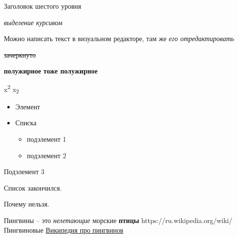 \documentclass[
  letterpaper,
  DIV=11,
  numbers=noendperiod]{scrartcl}
\begin{document}
Заголовок шестого уровня

\emph{выделение курсивом}

Можно написать текст в визуальном редакторе, там же \emph{его
отредактировать}

\sout{зачеркнуто}

\textbf{полужирное} \textbf{тоже полужирное}

x\textsuperscript{2} x\textsubscript{2}

\begin{itemize}
\item
  Элемент
\item
  Списка

  \begin{itemize}
  \item
    подэлемент 1
  \item
    подэлемент 2
  \end{itemize}
\end{itemize}

Подэлемент 3

Список закончился.

Почему нельзя.

Пингвины -- это \emph{нелетающие} морские \textbf{птицы}
https://ru.wikipedia.org/wiki/Пингвиновые
\href{https://ru.wikipedia.org/wiki/Пингвиновые}{Википедия про
пингвинов}
\end{document}
